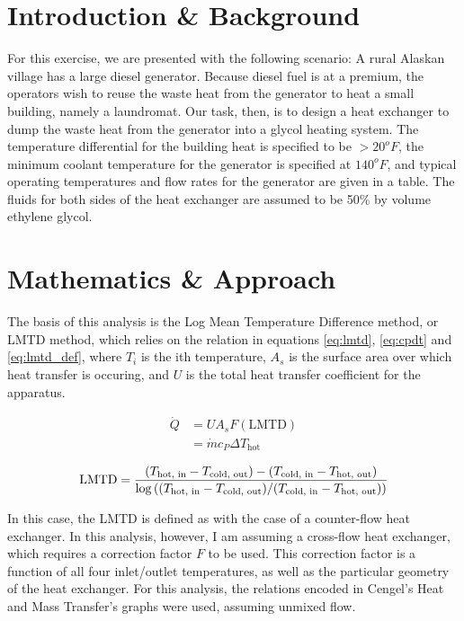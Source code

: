 \documentclass[12pt,letterpaper]{article}
\begin{document}
\sffamily

\section{Introduction \& Background}

For this exercise, we are presented with the following scenario: A rural Alaskan village has a large diesel generator. Because diesel fuel is at a premium, the operators wish to reuse the waste heat from the generator to heat a small building, namely a laundromat. Our task, then, is to design a heat exchanger to dump the waste heat from the generator into a glycol heating system. The temperature differential for the building heat is specified to be \(> 20^o F\), the minimum coolant temperature for the generator is specified at \(140^o F\), and typical operating temperatures and flow rates for the generator are given in a table.  The fluids for both sides of the heat exchanger are assumed to be 50\% by volume ethylene glycol.

\section{Mathematics \& Approach}

The basis of this analysis is the Log Mean Temperature Difference method, or LMTD method, which relies on the relation in equations \ref{eq:lmtd}, \ref{eq:cpdt} and \ref{eq:lmtd_def}, where \(T_i\) is the ith temperature, \(A_s\) is the surface area over which heat transfer is occuring, and \(U\) is the total heat transfer coefficient for the apparatus.

\begin{align}
\label{eq:lmtd}
\dot{Q} &= UA_s F(\textrm{LMTD})\\
\label{eq:cpdt}
        &= \dot{m}c_P \Delta T_{\textrm{hot}}
\end{align}

\begin{equation}
\label{eq:lmtd_def}
\textrm{LMTD} = 
\frac{ (T_{\textrm{hot, in}} - T_{\textrm{cold, out}} ) -
       (T_{\textrm{cold, in}} - T_{\textrm{hot, out}})
     }{
\log\left( 
    (T_{\textrm{hot, in}} - T_{\textrm{cold, out}} )
    \middle/ 
    (T_{\textrm{cold, in}} - T_{\textrm{hot, out}}) 
    \right) }
\end{equation}

In this case, the LMTD is defined as with the case of a counter-flow heat exchanger.  In this analysis, however, I am assuming a cross-flow heat exchanger, which requires a correction factor \(F\) to be used. This correction factor is a function of all four inlet/outlet temperatures, as well as the particular geometry of the heat exchanger.  For this analysis, the relations encoded in Cengel's Heat and Mass Transfer's graphs were used, assuming unmixed flow. 
\end{document}

